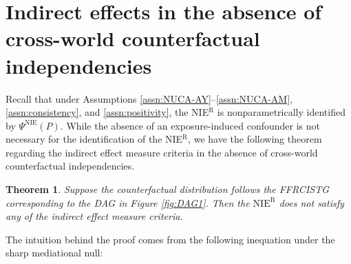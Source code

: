 \documentclass[12pt]{article}
\newtheorem{theorem}{Theorem}
\begin{document}
\section{Indirect effects in the absence of cross-world counterfactual independencies}
\label{sec:no-recanting}
Recall that under Assumptions \ref{assn:NUCA-AY}--\ref{assn:NUCA-AM}, \ref{assn:consistency}, and \ref{assn:positivity}, %
the NIE$^{\text{R}}$ is nonparametrically identified by $\Psi^{\text{NIE}}(P)$. While the absence of an exposure-induced confounder is not necessary for the identification of the NIE$^{\text{R}}$, we have the following theorem regarding the indirect effect measure criteria in the absence of cross-world counterfactual independencies.
\begin{theorem}
    \label{thm:FFRCISTG-SNC}
    Suppose the counterfactual distribution follows the FFRCISTG corresponding to the DAG in Figure \ref{fig:DAG1}. Then the $\text{NIE}^{\text{R}}$ does not satisfy any of the indirect effect measure criteria.
\end{theorem}
The intuition behind the proof comes from the following inequation under the sharp mediational null:
\end{document}
